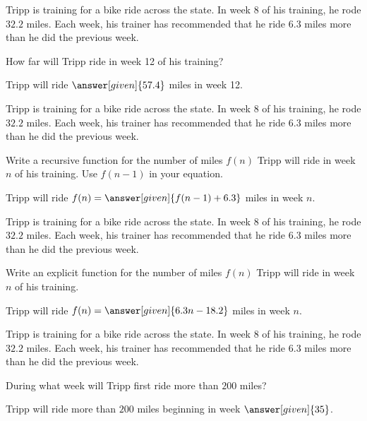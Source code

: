 \documentclass[nooutcomes]{ximera}
\begin{document}
\begin{problem}
Tripp is training for a bike ride across the state.  In week 8 of his training, he rode $32.2$ miles.  Each week, his trainer has recommended that he ride $6.3$ miles more than he did the previous week.

How far will Tripp ride in week 12 of his training?

\begin{prompt}
Tripp will ride $\answer[given]{57.4}$ miles in week 12.
\end{prompt}
\end{problem}



\begin{problem}
Tripp is training for a bike ride across the state.  In week 8 of his training, he rode $32.2$ miles.  Each week, his trainer has recommended that he ride $6.3$ miles more than he did the previous week.

Write a recursive function for the number of miles $f(n)$ Tripp will ride in week $n$ of his training.  Use $f(n-1)$ in your equation.

\begin{prompt}
Tripp will ride $f(n) = \answer[given]{f(n-1) + 6.3}$ miles in week $n$.
\end{prompt}
\end{problem}



\begin{problem}
Tripp is training for a bike ride across the state.  In week 8 of his training, he rode $32.2$ miles.  Each week, his trainer has recommended that he ride $6.3$ miles more than he did the previous week.

Write an explicit function for the number of miles $f(n)$ Tripp will ride in week $n$ of his training.

\begin{prompt}
Tripp will ride $f(n) = \answer[given]{6.3n-18.2}$ miles in week $n$.
\end{prompt}
\end{problem}




\begin{problem}
Tripp is training for a bike ride across the state.  In week 8 of his training, he rode $32.2$ miles.  Each week, his trainer has recommended that he ride $6.3$ miles more than he did the previous week.

During what week will Tripp first ride more than $200$ miles?

\begin{prompt}
Tripp will ride more than $200$ miles beginning in week $\answer[given]{35}$.
\end{prompt}
\end{problem}
\end{document}
